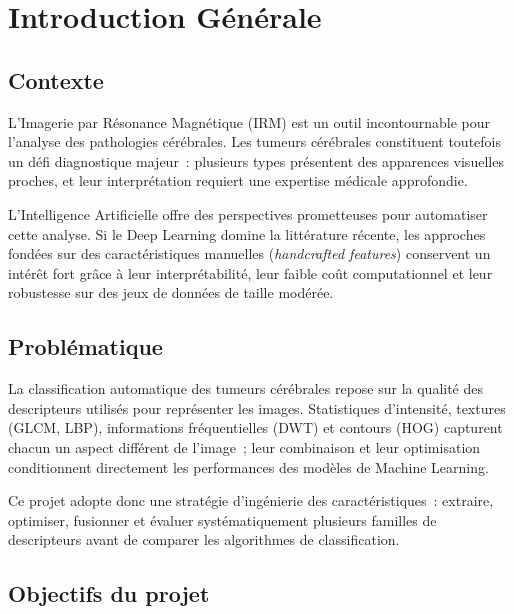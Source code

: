 \chapter*{Introduction Générale}
\setcounter{section}{0}
\renewcommand{\thesection}{\arabic{section}}

\section{Contexte}

L'Imagerie par Résonance Magnétique (IRM) est un outil incontournable pour l'analyse des
pathologies cérébrales. Les tumeurs cérébrales constituent toutefois un défi diagnostique
majeur~: plusieurs types présentent des apparences visuelles proches, et leur interprétation
requiert une expertise médicale approfondie.

L'Intelligence Artificielle offre des perspectives prometteuses pour automatiser cette
analyse. Si le Deep Learning domine la littérature récente, les approches fondées sur des
caractéristiques manuelles (\emph{handcrafted features}) conservent un intérêt fort grâce à
leur interprétabilité, leur faible coût computationnel et leur robustesse sur des jeux de
données de taille modérée.

\section{Problématique}

La classification automatique des tumeurs cérébrales repose sur la qualité des descripteurs
utilisés pour représenter les images. Statistiques d'intensité, textures (GLCM, LBP),
informations fréquentielles (DWT) et contours (HOG) capturent chacun un aspect différent de
l'image~; leur combinaison et leur optimisation conditionnent directement les performances
des modèles de Machine Learning.

Ce projet adopte donc une stratégie d'ingénierie des caractéristiques~: extraire,
optimiser, fusionner et évaluer systématiquement plusieurs familles de descripteurs avant de
comparer les algorithmes de classification.

\section{Objectifs du projet}

